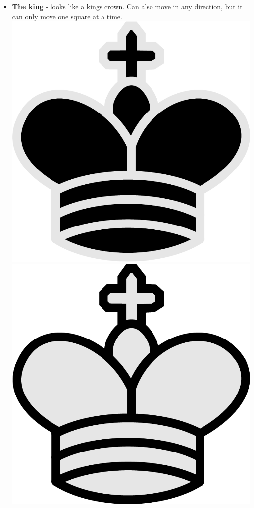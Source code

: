 \documentclass{article}
\begin{document}
\begin{itemize}
    \item \textbf{The king} - looks like a kings crown. Can also move in any direction, but it can only move one square at a time. \\
    \includegraphics[scale=0.1]{image9.png}
    \includegraphics[scale=0.1]{image8.png}
    

\end{itemize}
\end{document}
